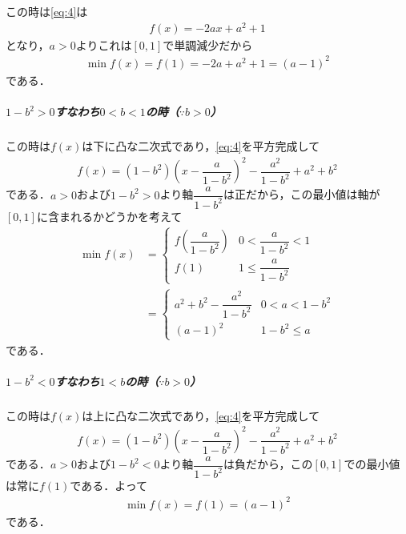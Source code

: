 \documentclass[../../main.tex]{subfiles}
\begin{document}
この時は\cref{eq:4}は
\begin{align}
  f(x) = -2ax +a^2+1
\end{align}
となり，$a>0$よりこれは$[0,1]$で単調減少だから
\begin{align}
  \min f(x) = f(1) = -2a + a^2 + 1 = (a-1)^2 \label{eq:5}
\end{align}
である．

\subparagraph{$1-b^2 > 0$すなわち$0 < b < 1$の時（$\because b>0$）}

この時は$f(x)$は下に凸な二次式であり，\cref{eq:4}を平方完成して
\begin{align}
  f(x) = \left(1-b^2\right)\left(x-\dfrac{a}{1-b^2}\right)^2 -\dfrac{a^2}{1-b^2} +a^2+b^2
\end{align}
である．$a>0$および$1-b^2>0$より軸$\dfrac{a}{1-b^2}$は正だから，この最小値は軸が$[0,1]$に含まれるかどうかを考えて
\begin{align}
  \min f(x)
  &=
  \begin{cases}
    f\left(\dfrac{a}{1-b^2}\right)  & 0<\dfrac{a}{1-b^2}<1 \\
    f\left(1\right) & 1 \le \dfrac{a}{1-b^2}
  \end{cases}  \\
  &=
  \begin{cases}
    a^2+b^2 -\dfrac{a^2}{1-b^2} & 0< a <1-b^2 \\
    (a-1)^2 & 1-b^2 \le a
  \end{cases} \label{eq:6}
\end{align}
である．

\subparagraph{$1-b^2 < 0$すなわち$1 < b$の時（$\because b>0$）}

この時は$f(x)$は上に凸な二次式であり，\cref{eq:4}を平方完成して
\begin{align}
  f(x) = \left(1-b^2\right)\left(x-\dfrac{a}{1-b^2}\right)^2 -\dfrac{a^2}{1-b^2} +a^2+b^2
\end{align}
である．$a>0$および$1-b^2<0$より軸$\dfrac{a}{1-b^2}$は負だから，この$[0,1]$での最小値は常に$f(1)$である．よって
\begin{align}
  \min f(x) = f(1) = (a-1)^2 \label{eq:7}
\end{align}
である．
\casesend
\end{document}
